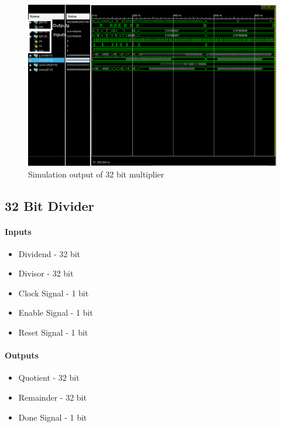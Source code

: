 \documentclass{article}
\begin{document}
    \begin{figure}[H]
        \centering
        \includegraphics[width=0.9\paperwidth,center]{Screenshots/multiplier_32.png}
        \caption{Simulation output of 32 bit multiplier}
    \end{figure}




    \subsection{32 Bit Divider}

    \paragraph{Inputs}
    \begin{itemize}
        \item Dividend - 32 bit
        \item Divisor - 32 bit
        \item Clock Signal - 1 bit
        \item Enable Signal - 1 bit
        \item Reset Signal - 1 bit
    \end{itemize}

    \paragraph{Outputs}
    \begin{itemize}
        \item Quotient - 32 bit
        \item Remainder - 32 bit
        \item Done Signal - 1 bit
    \end{itemize}
\end{document}
